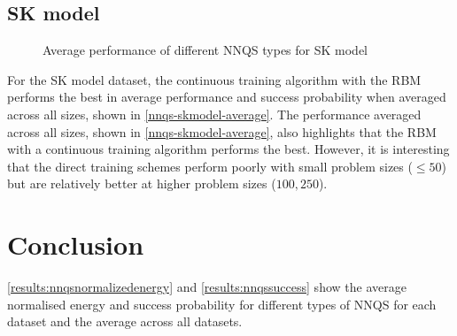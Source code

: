 \subsection{SK model}

\begin{figure}[!htb]
    \centering
    \hfill
    \caption{Average performance of different NNQS types for SK model}
    \label{nnqs-skmodel-average}
\end{figure}

For the SK model dataset, the continuous training algorithm with the RBM performs the best in average performance and success probability when averaged across all sizes, shown in \autoref{nnqs-skmodel-average}. The performance averaged across all sizes, shown in \autoref{nnqs-skmodel-average}, also highlights that the RBM with a continuous training algorithm performs the best. However, it is interesting that the direct training schemes perform poorly with small problem sizes ($\leq 50$) but are relatively better at higher problem sizes ($100, 250$).

\section{Conclusion}
\autoref{results:nnqsnormalizedenergy} and \autoref{results:nnqssuccess} show the average normalised energy and success probability for different types of NNQS for each dataset and the average across all datasets.


